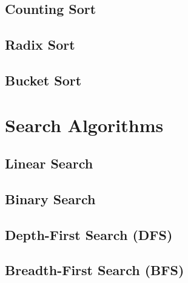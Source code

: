 \documentclass[11pt]{article}
\begin{document}
        \subsection{Counting Sort}
            

        \subsection{Radix Sort}
            

        \subsection{Bucket Sort}
            

\section{Search Algorithms}


        \subsection{Linear Search}
        \subsection{Binary Search}
        \subsection{Depth-First Search (DFS)}
        \subsection{Breadth-First Search (BFS)}


        \subsection{}
        \subsection{}
        \subsection{}
        \subsection{}
        \subsection{}
        \subsection{}
        \subsection{}
        \subsection{}
\end{document}
